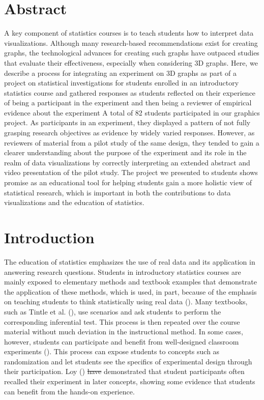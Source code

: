 \documentclass[
  12pt,
]{article}
\providecommand{\DIFadd}[1]{{\protect\color{blue}\uwave{#1}}} %
\providecommand{\DIFdel}[1]{{\protect\color{red}\sout{#1}}}                      %
\providecommand{\DIFaddbegin}{} %
\providecommand{\DIFaddend}{} %
\providecommand{\DIFdelbegin}{} %
\providecommand{\DIFdelend}{} %
\newcommand{\DIFscaledelfig}{0.5}
\newlength{\DIFdelgraphicswidth} %
\newlength{\DIFdelgraphicsheight} %
\newcommand{\DIFaddincludegraphics}[2][]{{\color{blue}\fbox{\DIFOincludegraphics[#1]{#2}}}} %
\newcommand{\DIFdelincludegraphics}[2][]{%
\sbox{\DIFdelgraphicsbox}{\DIFOincludegraphics[#1]{#2}}%
\settoboxwidth{\DIFdelgraphicswidth}{\DIFdelgraphicsbox} %
\settoboxtotalheight{\DIFdelgraphicsheight}{\DIFdelgraphicsbox} %
\scalebox{\DIFscaledelfig}{%
\parbox[b]{\DIFdelgraphicswidth}{\usebox{\DIFdelgraphicsbox}\\[-\baselineskip] \rule{\DIFdelgraphicswidth}{0em}}\llap{\resizebox{\DIFdelgraphicswidth}{\DIFdelgraphicsheight}{%
\setlength{\unitlength}{\DIFdelgraphicswidth}%
\begin{picture}(1,1)%
\thicklines\linethickness{2pt} %
{\color[rgb]{1,0,0}\put(0,0){\framebox(1,1){}}}%
{\color[rgb]{1,0,0}\put(0,0){\line( 1,1){1}}}%
{\color[rgb]{1,0,0}\put(0,1){\line(1,-1){1}}}%
\end{picture}%
}\hspace*{3pt}}} %
} %
\DeclareRobustCommand{\DIFaddbegin}{\DIFOaddbegin \let\includegraphics\DIFaddincludegraphics} %
\DeclareRobustCommand{\DIFaddend}{\DIFOaddend \let\includegraphics\DIFOincludegraphics} %
\DeclareRobustCommand{\DIFdelbegin}{\DIFOdelbegin \let\includegraphics\DIFdelincludegraphics} %
\DeclareRobustCommand{\DIFdelend}{\DIFOaddend \let\includegraphics\DIFOincludegraphics} %
\begin{document}
\section{Abstract}\label{abstract}

A key component of statistics courses is to teach students how to
interpret data visualizations. Although many research-based
recommendations exist for creating graphs, the technological advances
for creating such graphs have outpaced studies that evaluate their
effectiveness, especially when considering 3D graphs. Here, we describe
a process for integrating an experiment on 3D graphs as part of a
project on statistical investigations for students enrolled in an
introductory statistics course and gathered responses as students
reflected on their experience of being a participant in the experiment
and then being a reviewer of empirical evidence about the experiment A
total of 82 students participated in our graphics project. As
participants in an experiment, they displayed a pattern of not fully
grasping research objectives as evidence by widely varied responses.
However, as reviewers of material from a pilot study of the same design,
they tended to gain a clearer understanding about the purpose of the
experiment and its role in the realm of data visualizations by correctly
interpreting an extended abstract and video presentation of the pilot
study. The project we presented to students shows promise as an
educational tool for helping students gain a more holistic view of
statistical research, which is important in both the contributions to
data visualizations and the education of statistics.

\section{Introduction}\label{introduction}

The education of statistics emphasizes the use of real data and its
application in answering research questions. Students in introductory
statistics courses are mainly exposed to elementary methods and textbook
examples that demonstrate the application of these methods, which is
used, in part, because of the emphasis on teaching students to think
statistically using real data (). Many textbooks, such as Tintle et al.
(), use scenarios and ask students to
perform the corresponding inferential test. This process is then
repeated over the course material without much deviation in the
instructional method. In some cases, however, students can participate
and benefit from well-designed classroom experiments
(). This process can expose
students to concepts such as randomization and let students see the
specifics of experimental design through their participation. Loy
() \DIFdelbegin \DIFdel{have }\DIFdelend \DIFaddbegin \DIFadd{has }\DIFaddend demonstrated that student
participants often recalled their experiment in later concepts, showing
some evidence that students can benefit from the hands-on experience.
\end{document}
